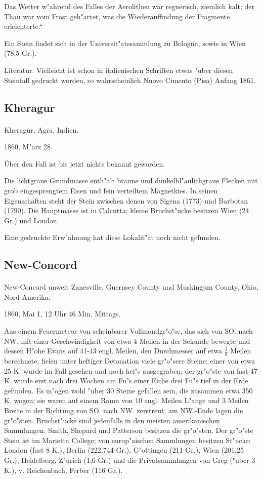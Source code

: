 \documentclass[a4paper, 11pt, oneside]{article}
\begin{document}
Das Wetter w"ahrend des Falles der Aerolithen war regnerisch, ziemlich kalt; der Thau war vom Frost geh"artet, was die Wiederauffindung der Fragmente erleichterte.“

Ein Stein findet sich in der Universit"atssammlung zu Bologna, sowie in Wien (78,5 Gr.).

\footnotesize
Literatur: Vielleicht ist schon in italienischen Schriften etwas "uber diesen Steinfall gedruckt worden, so wahrscheinlich Nuovo Cimento (Pisa) Anfang 1861.

\subsection{Kheragur}
\normalsize
\paragraph{}
Kheragur, Agra, Indien.

1860, M"arz 28.

Über den Fall ist bis jetzt nichts bekannt geworden.

Die lichtgraue Grundmasse enth"alt braune und dunkelbl"aulichgraue Flecken mit grob eingesprengtem Eisen und fein verteiltem Magnetkies. In seinen Eigenschaften steht der Stein zwischen denen von Sigena (1773) und Barbotan (1790). Die Hauptmasse ist in Calcutta; kleine Bruchst"ucke besitzen Wien (24 Gr.) und London.

Eine gedruckte Erw"ahnung hat diese Lokalit"at noch nicht gefunden.

\subsection{New-Concord}
\normalsize
\paragraph{}
New-Concord unweit Zanesville, Guernsey County und Muskingum County, Ohio, Nord-Amerika.

1860, Mai 1, 12 Uhr 46 Min. Mittags.

Aus einem Feuermeteor von scheinbarer Vollmondgr"o"se, das sich von SO. nach NW. mit einer Geschwindigkeit von etwa 4 Meilen in der Sekunde bewegte und dessen H"ohe Evans auf 41-43 engl. Meilen, den Durchmesser auf etwa $\frac{3}{8}$ Meilen berechnete, fielen unter heftiger Detonation viele gr"o"sere Steine; einer von etwa 25 K. wurde im Fall gesehen und noch hei"s ausgegraben; der gr"o"ste von fast 47 K. wurde erst nach drei Wochen am Fu"s einer Eiche drei Fu"s tief in der Erde gefunden. Es m"ogen wohl "uber 30 Steine gefallen sein, die zusammen etwa 350 K. wogen; sie waren auf einem Raum von 10 engl. Meilen L"ange und 3 Meilen Breite in der Richtung von SO. nach NW. zerstreut; am NW.-Ende lagen die gr"o"sten. Bruchst"ucke sind jedenfalls in den meisten amerikanischen Sammlungen. Smith, Shepard und Patterson besitzen die gr"o"sten. Der gr"o"ste Stein ist im Marietta College; von europ"aischen Sammlungen besitzen St"ucke: London (fast 8 K.), Berlin (222,744 Gr.), G"ottingen (211 Gr.), Wien (201,25 Gr.), Heidelberg, Z"urich (1,6 Gr.) und die Privatsammlungen von Greg ("uber 3 K.), v. Reichenbach, Ferber (116 Gr.).
\end{document}
